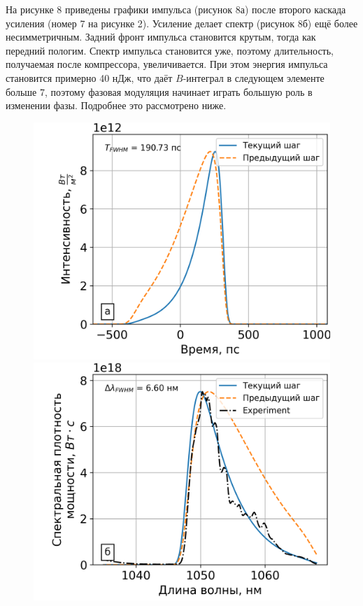 \documentclass[12pt]{article}
\begin{document}
На рисунке 8 приведены графики импульса (рисунок 8а) после второго каскада усиления (номер 7 на рисунке 2). Усиление
делает спектр (рисунок 8б) ещё более несимметричным. Задний фронт импульса становится крутым, тогда как
передний пологим. Спектр импульса становится уже, поэтому длительность, получаемая после компрессора, увеличивается.
При этом энергия импульса становится примерно 40 нДж, что даёт $B$-интеграл в следующем элементе больше 7, поэтому фазовая
модуляция начинает играть большую роль в изменении фазы. Подробнее это рассмотрено ниже.

\begin{figure}[h!]
  \centering
  \begin{minipage}[b]{0.5\textwidth}
    \includegraphics[width=\linewidth]{Images/Gauss Pulse/Импульс и спектр/!14. Yb3+ 6_125, 0.8m_pusle}
  \end{minipage}%
  \begin{minipage}[b]{0.5\textwidth}
    \includegraphics[width=\linewidth]{Images/Gauss Pulse/Импульс и спектр/!14. Yb3+ 6_125, 0.8m_spectrum}
  \end{minipage}


\end{figure}
\end{document}
